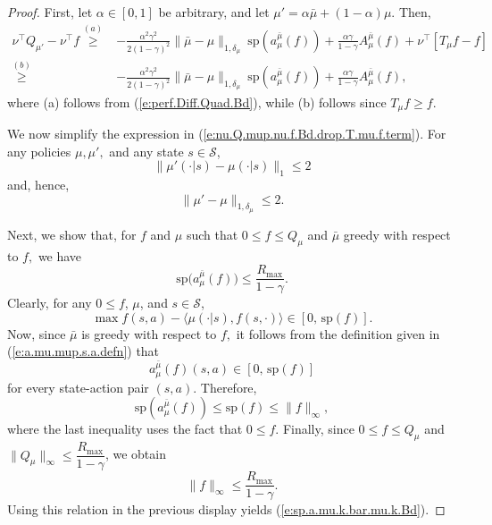 \documentclass[10pt,a4paper]{amsart}
\newcommand{\cS}{\mathcal{S}}
\newcommand{\mub}{\bar{\mu}}
\newcommand{\mup}{\mu'}
\newcommand{\tr}{\top}
\renewcommand{\eqref}[1]{(\ref{#1})}
\renewcommand{\sp}{\mathrm{sp}}
\begin{document}
\begin{proof}
    First, let $\alpha \in [0, 1]$ be arbitrary, and let $\mup = \alpha \mub + (1 - \alpha) \mu.$ Then, 
    \begin{align}
        \nu^\tr Q_{\mup} - \nu^\tr f \overset{(a)}{\geq} {} & - \frac{ \alpha^2 \gamma^2}{2  (1 - \gamma)^2} \|\mub - \mu\|_{1, \delta_\mu}\ \sp(a_\mu^{\mub} (f)) + \frac{ \alpha\gamma}{1 - \gamma} A_{\mu}^{\mub} (f) + \nu^\tr [T_{\mu}f - f] \\
        \overset{(b)}{\geq} {} & - \frac{ \alpha^2 \gamma^2}{2  (1 - \gamma)^2} \|\mub - \mu\|_{1, \delta_\mu}\ \sp(a_\mu^{\mub} (f)) + \frac{ \alpha\gamma}{1 - \gamma} A_{\mu}^{\mub} (f) \label{e:nu.Q.mup.nu.f.Bd.drop.T.mu.f.term},
    \end{align}
    where (a) follows from \eqref{e:perf.Diff.Quad.Bd}, while (b) follows since $T_{\mu} f \geq f.$

    We now simplify the expression in \eqref{e:nu.Q.mup.nu.f.Bd.drop.T.mu.f.term}. For any policies $\mu, \mup,$ and any state $s \in \cS$,
    \begin{equation}
        \| \mup(\cdot|s)-\mu(\cdot|s) \|_{1} \le 2
    \end{equation}
    and, hence, 
    \begin{equation}
    \label{e:mu.mup.gap.Bd}
        \|\mup - \mu\|_{1, \delta_\mu} \leq 2.
    \end{equation}
    
    Next, we show that, for $f$ and $\mu$ such that $0 \leq f \leq Q_{\mu}$ and $\mub$ greedy with respect to $f,$ we have
    \begin{equation}
    \label{e:sp.a.mu.k.bar.mu.k.Bd}
        \sp \big(a^{\mub}_{\mu}(f)\big) \le \frac{R_{\max}}{1-\gamma}.
    \end{equation}
    Clearly, for any $0 \leq f$, $\mu$, and $s \in \cS$,
    \begin{equation}
        \max f(s, a)-\langle \mu(\cdot|s), f(s,\cdot)\rangle \in [0,\, \sp(f)].
    \end{equation}
    Now, since $\mub$ is greedy with respect to $f,$ it follows from the definition given in  \eqref{e:a.mu.mup.s.a.defn} that
    \[
        a_{\mu}^{\mub}(f)(s, a) \in [0,\, \sp(f)]
    \]
    for every state-action pair $(s, a).$ Therefore,
    \[
        \sp(a_{\mu}^{\mub}(f)) \le \sp(f) \le \|f\|_\infty,
    \]
    where the last inequality uses the fact that $0 \leq f.$
    Finally, since \(0 \le f \le Q_\mu\) and \(\|Q_\mu\|_\infty \leq \dfrac{R_{\max}}{1-\gamma}\), we obtain
    \[
        \|f\|_\infty \le \frac{R_{\max}}{1-\gamma}.
    \]
    Using this relation in the previous display yields \eqref{e:sp.a.mu.k.bar.mu.k.Bd}.
    

\end{proof}
\end{document}
